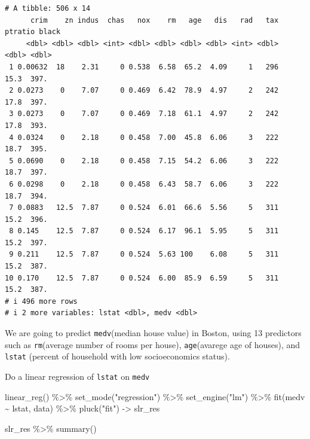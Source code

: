\documentclass[
  letterpaper,
  DIV=11,
  numbers=noendperiod]{scrreprt}
\newenvironment{Shaded}{\begin{snugshade}}{\end{snugshade}}
\newcommand{\FunctionTok}[1]{\textcolor[rgb]{0.02,0.16,0.49}{#1}}
\newcommand{\NormalTok}[1]{\textcolor[rgb]{0.33,0.33,0.33}{#1}}
\newcommand{\OtherTok}[1]{\textcolor[rgb]{0.85,0.12,0.09}{#1}}
\newcommand{\SpecialCharTok}[1]{\textcolor[rgb]{0.00,0.46,0.62}{#1}}
\newcommand{\StringTok}[1]{\textcolor[rgb]{0.00,0.50,0.00}{#1}}
\begin{document}
\begin{verbatim}
# A tibble: 506 x 14
      crim    zn indus  chas   nox    rm   age   dis   rad   tax ptratio black
     <dbl> <dbl> <dbl> <int> <dbl> <dbl> <dbl> <dbl> <int> <dbl>   <dbl> <dbl>
 1 0.00632  18    2.31     0 0.538  6.58  65.2  4.09     1   296    15.3  397.
 2 0.0273    0    7.07     0 0.469  6.42  78.9  4.97     2   242    17.8  397.
 3 0.0273    0    7.07     0 0.469  7.18  61.1  4.97     2   242    17.8  393.
 4 0.0324    0    2.18     0 0.458  7.00  45.8  6.06     3   222    18.7  395.
 5 0.0690    0    2.18     0 0.458  7.15  54.2  6.06     3   222    18.7  397.
 6 0.0298    0    2.18     0 0.458  6.43  58.7  6.06     3   222    18.7  394.
 7 0.0883   12.5  7.87     0 0.524  6.01  66.6  5.56     5   311    15.2  396.
 8 0.145    12.5  7.87     0 0.524  6.17  96.1  5.95     5   311    15.2  397.
 9 0.211    12.5  7.87     0 0.524  5.63 100    6.08     5   311    15.2  387.
10 0.170    12.5  7.87     0 0.524  6.00  85.9  6.59     5   311    15.2  387.
# i 496 more rows
# i 2 more variables: lstat <dbl>, medv <dbl>
\end{verbatim}

We are going to predict \texttt{medv}(median house value) in Boston,
using 13 predictors such as \texttt{rm}(average number of rooms per
house), \texttt{age}(avarege age of houses), and \texttt{lstat} (percent
of household with low socioeconomics status).

Do a linear regression of \texttt{lstat} on \texttt{medv}

\begin{Shaded}
\begin{Highlighting}[]
\FunctionTok{linear\_reg}\NormalTok{() }\SpecialCharTok{\%\textgreater{}\%} 
  \FunctionTok{set\_mode}\NormalTok{(}\StringTok{"regression"}\NormalTok{) }\SpecialCharTok{\%\textgreater{}\%} 
  \FunctionTok{set\_engine}\NormalTok{(}\StringTok{"lm"}\NormalTok{) }\SpecialCharTok{\%\textgreater{}\%} 
  \FunctionTok{fit}\NormalTok{(medv }\SpecialCharTok{\textasciitilde{}}\NormalTok{ lstat, data) }\SpecialCharTok{\%\textgreater{}\%}
  \FunctionTok{pluck}\NormalTok{(}\StringTok{"fit"}\NormalTok{) }\OtherTok{{-}\textgreater{}}\NormalTok{ slr\_res }

\NormalTok{slr\_res }\SpecialCharTok{\%\textgreater{}\%} \FunctionTok{summary}\NormalTok{()}
\end{Highlighting}
\end{Shaded}
\end{document}
